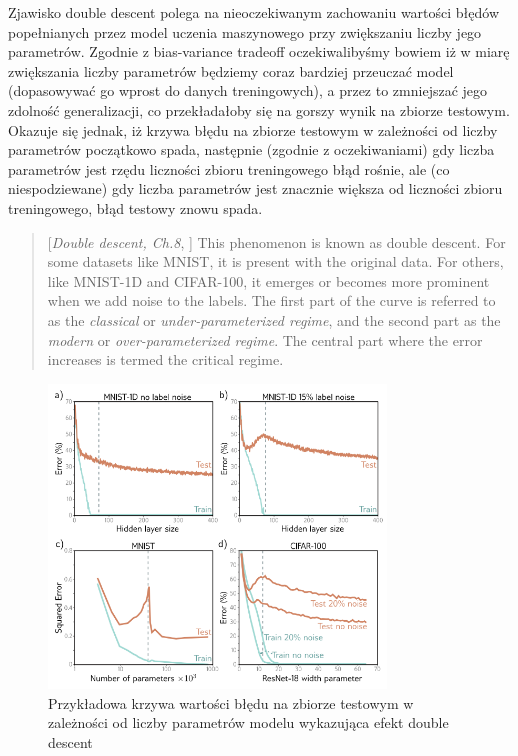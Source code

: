 \documentclass{myclass}
\numberwithin{equation}{subsection}
\begin{document}
Zjawisko double descent polega na nieoczekiwanym zachowaniu wartości błędów popełnianych przez model
uczenia maszynowego przy zwiększaniu liczby jego parametrów. Zgodnie z bias-variance tradeoff
oczekiwalibyśmy bowiem iż w miarę zwiększania liczby parametrów będziemy coraz bardziej przeuczać
model (dopasowywać go wprost do danych treningowych), a przez to zmniejszać jego zdolność
generalizacji, co przekładałoby się na gorszy wynik na zbiorze testowym. Okazuje się jednak, iż
krzywa błędu na zbiorze testowym w zależności od liczby parametrów początkowo spada, następnie
(zgodnie z oczekiwaniami) gdy liczba parametrów jest rzędu liczności zbioru treningowego błąd
rośnie, ale (co niespodziewane) gdy liczba parametrów jest znacznie większa od liczności zbioru
treningowego, błąd testowy znowu spada.

\begin{quote}[\textit{Double descent, Ch.8}, \cite{prince2023understanding}]
This phenomenon is known as double descent. For some datasets like MNIST, it is present with the
original data. For others, like MNIST-1D and CIFAR-100, it emerges or becomes more prominent when we
add noise to the labels. The first part of the curve is referred to as the \emph{classical} or
\emph{under-parameterized regime}, and the second part as the \emph{modern} or
\emph{over-parameterized regime}. The central part where the error increases is termed the critical
regime.
\end{quote}

\begin{figure}[ht]
\centering
\includegraphics[width=0.8\textwidth]{figs/double_descent.png}
\caption{Przykładowa krzywa wartości błędu na zbiorze testowym w zależności od liczby parametrów modelu wykazująca efekt double descent}
\label{fig:double-descent}
\end{figure}
\end{document}

